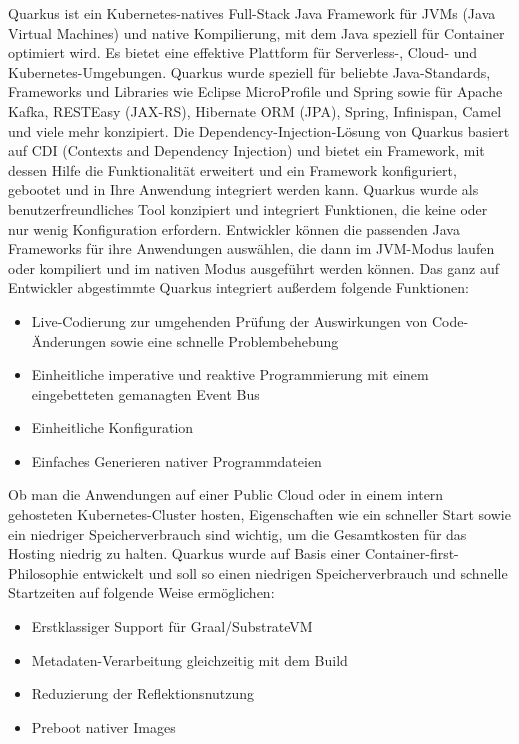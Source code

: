 Quarkus ist ein Kubernetes-natives Full-Stack Java Framework für JVMs (Java Virtual Machines) und native Kompilierung, mit dem Java speziell für Container optimiert wird. 
Es bietet eine effektive Plattform für Serverless-, Cloud- und Kubernetes-Umgebungen. Quarkus wurde speziell für beliebte Java-Standards, Frameworks und Libraries wie Eclipse MicroProfile und Spring
sowie für Apache Kafka, RESTEasy (JAX-RS), Hibernate ORM (JPA), Spring, Infinispan, Camel und viele mehr konzipiert.
Die Dependency-Injection-Lösung von Quarkus basiert auf CDI (Contexts and Dependency Injection) und bietet ein Framework, mit dessen Hilfe die Funktionalität 
erweitert und ein Framework konfiguriert, gebootet und in Ihre Anwendung integriert werden kann. 
Quarkus wurde als benutzerfreundliches Tool konzipiert und integriert Funktionen, die keine oder nur wenig Konfiguration erfordern.
Entwickler können die passenden Java Frameworks für ihre Anwendungen auswählen, die dann im JVM-Modus laufen oder kompiliert und im nativen Modus ausgeführt werden können.
Das ganz auf Entwickler abgestimmte Quarkus integriert außerdem folgende Funktionen:
\begin{itemize}
    \item Live-Codierung zur umgehenden Prüfung der Auswirkungen von Code-Änderungen sowie eine schnelle Problembehebung
    \item Einheitliche imperative und reaktive Programmierung mit einem eingebetteten gemanagten Event Bus
    \item Einheitliche Konfiguration
    \item Einfaches Generieren nativer Programmdateien
\end{itemize}
Ob man die Anwendungen auf einer Public Cloud oder in einem intern gehosteten Kubernetes-Cluster hosten, Eigenschaften wie ein schneller 
Start sowie ein niedriger Speicherverbrauch sind wichtig, um die Gesamtkosten für das Hosting niedrig zu halten.
Quarkus wurde auf Basis einer Container-first-Philosophie entwickelt und soll so einen niedrigen Speicherverbrauch und schnelle Startzeiten auf folgende Weise ermöglichen:
\begin{itemize}
    \item Erstklassiger Support für Graal/SubstrateVM
    \item Metadaten-Verarbeitung gleichzeitig mit dem Build
    \item Reduzierung der Reflektionsnutzung
    \item Preboot nativer Images
\end{itemize}
